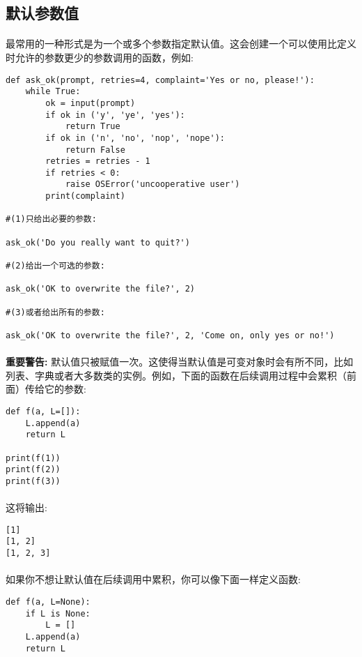 \documentclass{article}
\begin{document}
\begin{CJK}{UTF8}{gbsn}
\section{默认参数值}
\paragraph{}
最常用的一种形式是为一个或多个参数指定默认值。这会创建一个可以使用比定义时允许的参数更少的参数调用的函数，例如:
\begin{verbatim}
def ask_ok(prompt, retries=4, complaint='Yes or no, please!'):
    while True:
        ok = input(prompt)
        if ok in ('y', 'ye', 'yes'):
            return True
        if ok in ('n', 'no', 'nop', 'nope'):
            return False
        retries = retries - 1
        if retries < 0:
            raise OSError('uncooperative user')
        print(complaint)

#(1)只给出必要的参数:

ask_ok('Do you really want to quit?')

#(2)给出一个可选的参数:

ask_ok('OK to overwrite the file?', 2)

#(3)或者给出所有的参数:

ask_ok('OK to overwrite the file?', 2, 'Come on, only yes or no!')
\end{verbatim}
\paragraph{}
\textbf{重要警告:} 默认值只被赋值一次。这使得当默认值是可变对象时会有所不同，比如列表、字典或者大多数类的实例。例如，下面的函数在后续调用过程中会累积（前面）传给它的参数:
\begin{verbatim}
def f(a, L=[]):
    L.append(a)
    return L

print(f(1))
print(f(2))
print(f(3))
\end{verbatim}
\paragraph{}
这将输出:
\begin{verbatim}
[1]
[1, 2]
[1, 2, 3]
\end{verbatim}
\paragraph{}
如果你不想让默认值在后续调用中累积，你可以像下面一样定义函数:
\begin{verbatim}
def f(a, L=None):
    if L is None:
        L = []
    L.append(a)
    return L
\end{verbatim}

\end{CJK}
\end{document}

